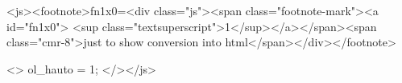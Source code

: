 \def\jstoday{2009-05-04 09:42:00}    <js><footnote>fn1x0=<div class="js"><span class="footnote-mark"><a 
 id="fn1x0">   <sup class="textsuperscript">1</sup></a></span><span 
class="cmr-8">just to show conversion into html</span></div></footnote> 

   <>    ol_hauto = 1;                                                                                                   </></js>